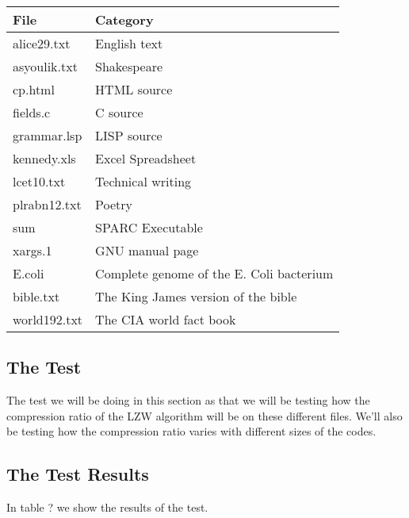 \begin{refsection}
\begin{table}
  \centering
  \begin{tabular}{ll}
    \toprule
    File & Category \\
    \midrule
    alice29.txt & English text \\
    asyoulik.txt & Shakespeare \\
    cp.html & HTML source \\
    fields.c & C source \\
    grammar.lsp & LISP source \\
    kennedy.xls & Excel Spreadsheet \\
    lcet10.txt & Technical writing \\
    plrabn12.txt & Poetry \\
    sum & SPARC Executable \\
    xargs.1 & GNU manual page \\
    E.coli & Complete genome of the E. Coli bacterium \\
    bible.txt & The King James version of the bible \\
    world192.txt & The CIA world fact book \\
    \bottomrule
  \end{tabular}
  \caption{}
  \label{tab:corp-files}
\end{table}

\subsection{The Test}

The test we will be doing in this section as that we will be testing
how the compression ratio of the LZW algorithm will be on these
different files. We'll also be testing how the compression ratio
varies with different sizes of the codes.

\subsection{The Test Results}

In table ? we show the results of the test.



\end{refsection}
